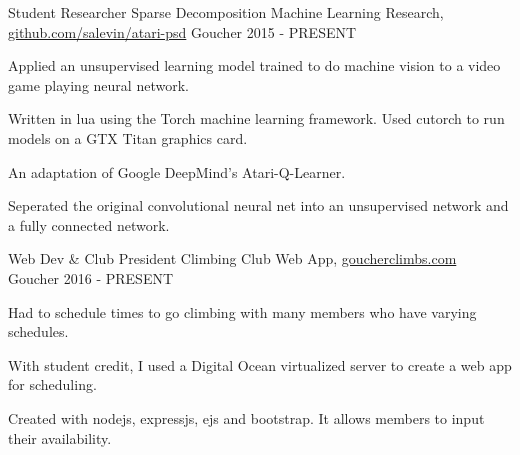 

\begin{cventries}

  \cventry
    {Student Researcher} %
    {Sparse Decomposition Machine Learning Research{\normalfont, \href{https://github.com/salevin/atari-psd}{github.com/salevin/atari-psd}}} %
    {Goucher} %
    {2015 - PRESENT} %
    {
      \begin{cvitems} %
        \item {Applied an unsupervised learning model trained to do machine vision to a video game playing neural network.}
        \item {Written in lua using the Torch machine learning framework. Used cutorch to run models on a GTX Titan graphics card.}
        \item {An adaptation of Google DeepMind's Atari-Q-Learner}.
        \item {Seperated the original convolutional neural net into an unsupervised network and a fully connected network.}
      \end{cvitems}
    }

  \cventry
    {Web Dev \& Club President} %
    {Climbing Club Web App{\normalfont, \href{http://www.goucherclimbs.com/}{goucherclimbs.com}} } %
    {Goucher} %
    {2016 - PRESENT} %
    {
      \begin{cvitems} %
        \item {Had to schedule times to go climbing with many members who have varying schedules.}
        \item {With student credit, I used a Digital Ocean virtualized server to create a web app for scheduling.}
        \item {Created with nodejs, expressjs, ejs and bootstrap. It allows members to input their availability.}
      \end{cvitems}
    }

\end{cventries}
